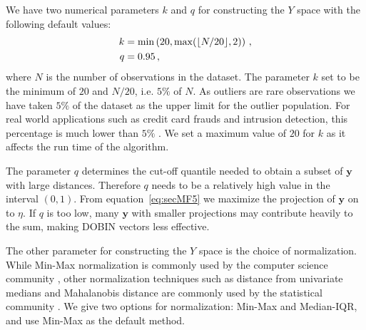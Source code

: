 \documentclass[letter,12pt]{article}
\begin{document}
We have {\color{blue} two} numerical parameters {\color{blue} $k$ } and $q$ for constructing the $Y$ space with the following default values:
\begin{align} \label{eq:secMF15}
	k & = \min\left(20, \max (\lfloor N/20 \rfloor ,2) \right) \notag \, , \\
	q   & = 0.95 \notag \, ,
\end{align}
where $N$ is the number of observations in the dataset. {\color{blue} The parameter $k$ set to be the minimum of $20$ and $N/20$, i.e.  $5\%$ of $N$. As outliers are rare observations we have taken $5\%$ of the dataset as the upper limit for the outlier population. For real world applications such as credit card frauds and intrusion detection, this percentage is much lower than $5\%$ \citep{goldstein2016comparative, kaggle_dat_cc_fraud}.}  We set a maximum value of $20$ for $k$ as it affects the run time of the algorithm. %

The parameter $q$ determines the cut-off quantile needed to obtain a subset of $\bm{y}$ with large distances. Therefore $q$ needs to be a relatively high value in the interval $(0,1)$. From equation~\eqref{eq:secMF5} we maximize the projection of $\bm{y}$ on to $\eta$. If $q$ is too low, many $\bm{y}$ with smaller projections may contribute heavily to the sum, making DOBIN vectors less effective.

The other parameter for constructing the $Y$ space is the choice of normalization. While Min-Max normalization is commonly used by the computer science community \citep{campos2016evaluation}, other normalization techniques such as distance from univariate medians and Mahalanobis distance are commonly used by the statistical community \citep{billor2000bacon}. We give two options for normalization: Min-Max and Median-IQR,  { \color{blue} and use  Min-Max as the default method. }
\end{document}
